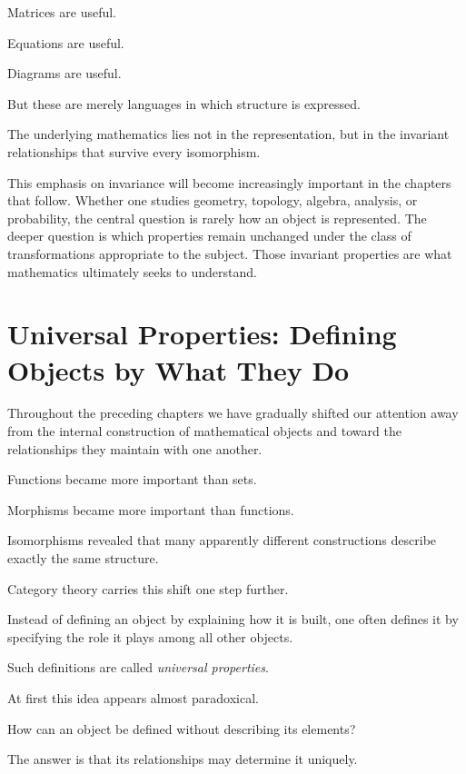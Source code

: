 \documentclass[11pt]{book}
\numberwithin{equation}{chapter}
\theoremstyle{definition}
\theoremstyle{plain}
\theoremstyle{remark}
\begin{document}
Matrices are useful.

Equations are useful.

Diagrams are useful.

But these are merely languages in which structure is expressed.

The underlying mathematics lies not in the representation, but in the invariant relationships that survive every isomorphism.

This emphasis on invariance will become increasingly important in the chapters that follow. Whether one studies geometry, topology, algebra, analysis, or probability, the central question is rarely how an object is represented. The deeper question is which properties remain unchanged under the class of transformations appropriate to the subject. Those invariant properties are what mathematics ultimately seeks to understand.


\section{Universal Properties: Defining Objects by What They Do}

Throughout the preceding chapters we have gradually shifted our attention away from the internal construction of mathematical objects and toward the relationships they maintain with one another.

Functions became more important than sets.

Morphisms became more important than functions.

Isomorphisms revealed that many apparently different constructions describe exactly the same structure.

Category theory carries this shift one step further.

Instead of defining an object by explaining how it is built, one often defines it by specifying the role it plays among all other objects.

Such definitions are called \emph{universal properties}.

At first this idea appears almost paradoxical.

How can an object be defined without describing its elements?

The answer is that its relationships may determine it uniquely.
\end{document}
